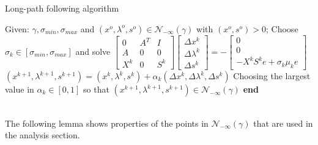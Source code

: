 \documentclass[a4paper,10 pt,titlepage,twoside]{book}
\theoremstyle{plain}
\theoremstyle{definition}
\theoremstyle{remark}
\begin{document}
\begin{algorithm}
	\caption{Long-path following algorithm}
	\begin{algorithmic}[1]		
		\State Given: $\gamma, \sigma_{min}, \sigma_{max}$ and $(x^{o}, \lambda^{o}, s^{o})\in\mathcal{N}_{-\infty}(\gamma)$ with $(x^{o}, s^{o})>0$;
		\State Choose $\sigma_{k}\in[\sigma_{min},\sigma_{max}]$ and solve
		\State $\begin{bmatrix}
			0&A^{T}&I \\A&0&0\\X^{k}&0&S^{k}
			\end{bmatrix}\begin{bmatrix}
			\Delta x^{k}\\\Delta\lambda^{k} \\\Delta s^{k}
			\end{bmatrix}=-\begin{bmatrix}
			0\\0\\-X^{k}S^{k}e + \sigma_{k}\mu_{k}e
			\end{bmatrix}$
		\State $(x^{k+1}, \lambda^{k+1}, s^{k+1}) = (x^{k}, \lambda^{k}, s^{k})+ \alpha_{k}(\Delta x^{k}, \Delta\lambda^{k}, \Delta s^{k})$
		\State Choosing the largest value in $\alpha_{k}\in[0,1]$ so that $(x^{k+1}, \lambda^{k+1}, s^{k+1})\in\mathcal{N}_{-\infty}(\gamma)$	
\textbf{end}
	\end{algorithmic}
\end{algorithm}\\
The following lemma shows properties of the points in $\mathcal{N}_{-\infty}(\gamma)$ that are used in the analysis section.
\end{document}
